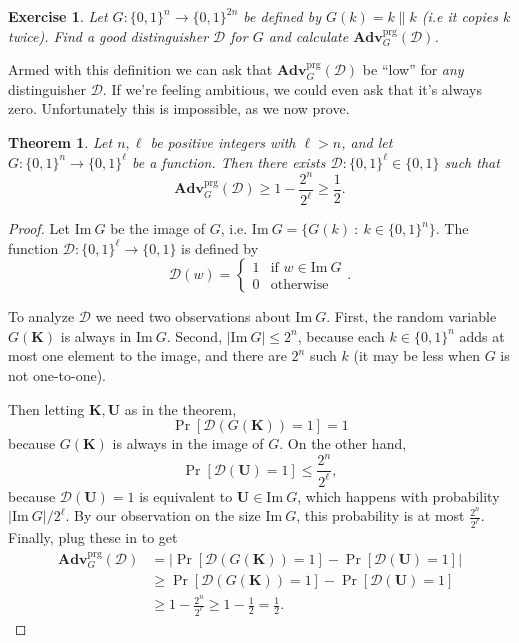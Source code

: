 \documentclass[11pt]{article}
\newtheorem{exercise}{Exercise}
\newtheorem{theorem}{Theorem}
\newcommand{\calD}{\mathcal{D}}
\newcommand{\Adv}{\mathbf{Adv}}
\newcommand{\AdvPRG}[2]{\Adv^{\mathrm{prg}}_{#1}({#2})}
\newcommand{\bits}{\{0,1\}}
\newcommand{\bK}{\mathbf{K}}
\newcommand{\bU}{\mathbf{U}}
\newcommand{\Img}{\mathrm{Im}}
\begin{document}
\begin{exercise}
    Let $G:\bits^n\to\bits^{2n}$ be defined by $G(k)=k\|k$ (i.e it copies
    $k$ twice). Find a good distinguisher $\calD$ for $G$ and calculate
    $\AdvPRG{G}{\calD}$.
\end{exercise}

Armed with this definition we can ask that $\AdvPRG{G}{\calD}$ be ``low''
for \emph{any} distinguisher $\calD$. If we're feeling ambitious, we
could even ask that it's always zero. Unfortunately this is impossible,
as we now prove.
\begin{theorem}
    Let $n,\ell$ be positive integers with $\ell>n$, and let
    $G:\bits^n\to\bits^\ell$ be a function. Then there exists
    $\calD:\bits^\ell\in\bits$ such that
    \[
        \AdvPRG{G}{\calD} \geq 1- \frac{2^n}{2^\ell} \geq \frac{1}{2}.
    \]
\end{theorem}
\begin{proof}
    Let $\Img\ G$ be the image of $G$, i.e. $\Img\ G = \{G(k) \ :\
    k\in\bits^n\}$.  The function $\calD:\bits^\ell\to\bits$ is defined by
    \[
        \calD(w) =
        \begin{cases}
            1 & \text{if $w\in\Img\ G$} \\
            0 & \text{otherwise}
        \end{cases}.
    \]
    
    To analyze $\calD$ we need two observations about $\Img\ G$. First, the
    random variable $G(\bK)$ is always in $\Img\ G$. Second, $|\Img\ G| \leq
    2^n$, because each $k\in\bits^n$ adds at most one element to the image, and
    there are $2^n$ such $k$ (it may be less when $G$ is not one-to-one).

    Then letting $\bK,\bU$ as in the theorem,
    \[
        \Pr[\calD(G(\bK))=1]=1
    \]
    because $G(\bK)$ is always in the image of $G$. On the other hand,
    \[
        \Pr[\calD(\bU)=1] \leq \frac{2^n}{2^\ell},
    \]
    because $\calD(\bU)=1$ is equivalent to $\bU\in\Img\ G$, which happens
    with probability $|\Img\ G|/2^\ell$. By our observation on the size
    $\Img\ G$, this probability is at most $\frac{2^n}{2^\ell}$. Finally,
    plug these in to get
    \begin{align*}
        \AdvPRG{G}{\calD} & =  
        |\Pr[\calD(G(\bK))=1] - \Pr[\calD(\bU)=1]| \\
        & \geq 
        \Pr[\calD(G(\bK))=1] - \Pr[\calD(\bU)=1] \\
        & \geq 
         1 - \frac{2^n}{2^\ell} \geq 1 - \frac{1}{2} = \frac{1}{2}.
    \end{align*}
\end{proof}
\end{document}

